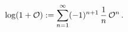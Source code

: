\begin{equation}
  \label{eq:deflog}
\log (1+{\cal O}) := 
\sum\limits_{n=1}^\infty (-1)^{n+1} \, {1 \over n} \, {\cal O}^n   \,.
\end{equation}

